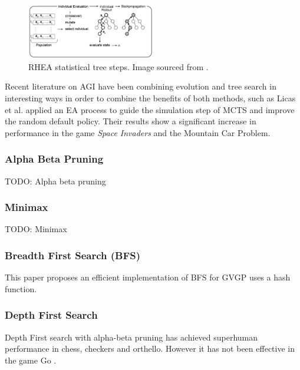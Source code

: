 \documentclass[journal]{IEEEtran}
\begin{document}
			\begin{figure}[h]
		   		 \centering
		   		 \includegraphics[width=0.5\textwidth]{RHEArollout}
		    		 \caption{RHEA statistical tree steps. Image sourced from \cite{gaina2017rolling}. }
		  		 \label{fig:RHEArollout}
			\end{figure}


			Recent literature on AGI have been combining evolution and tree search in interesting ways in order to combine the benefits of both methods, such as Licas et al. \cite{lucas2014fast} applied an EA process to guide the simulation step of MCTS and improve the random default policy. Their results show a significant increase in performance in the game \textit{Space Invaders} and the Mountain Car Problem.
			
		
		
		\subsubsection{Alpha Beta Pruning}
			TODO: Alpha beta pruning
		
		\subsubsection{Minimax}
			TODO: Minimax
		
		
		\subsubsection{Breadth First Search (BFS) }\label{sssec:BFS}
			This paper proposes an efficient implementation of BFS for GVGP \cite{EfficientBFS} uses a hash function.
		
		\subsubsection{Depth First Search}

			Depth First search with alpha-beta pruning \cite{knuth1975analysis} has achieved superhuman performance in chess, checkers and orthello. However it has not been effective in the game Go \cite{silver2016mastering}.
		
\end{document}
